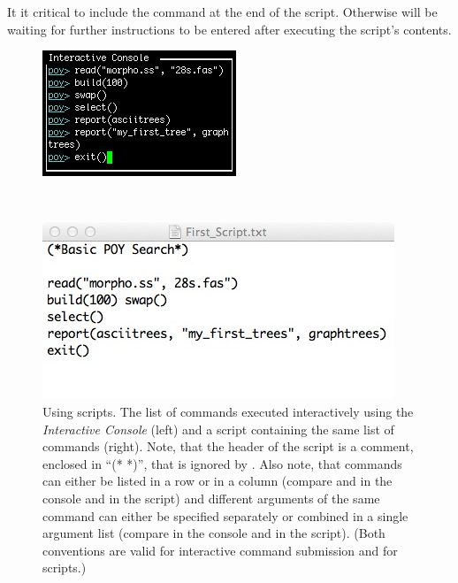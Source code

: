 {It it critical to include the command  at the end of the script. Otherwise \poy will be waiting for further 
instructions to be entered after executing the script's contents.

\begin{figure}
\centering
\begin{minipage}[c]{0.42\textwidth}
   		\includegraphics[width=\textwidth]{doc/figures/commandlist.jpg}
\end{minipage}
\,
\begin{minipage}[c]{0.53\textwidth}
	   	\includegraphics[width=\textwidth]{doc/figures/script.jpg}
   	\end{minipage}
\caption{Using \poy scripts. The list of commands executed interactively using the \emph{Interactive Console} 
(left) and a script containing the same list of commands (right). Note, that the header of the script is a comment, 
enclosed in ``(* *)'', that is ignored by \poy. Also note, that commands can either be listed in a row or in a column 
(compare  and  in the console and in the script) and different 
arguments of the same command can either be specified separately or combined in a single argument list 
(compare  in the console and in the script). (Both conventions are valid for interactive 
command submission and for scripts.)}
\label{fig:script}
\end{figure}

}
